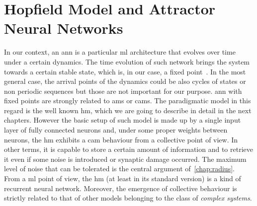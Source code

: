 \documentclass[\rootdir/main.tex]{subfiles}
\begin{document}
\section*{Hopfield Model and Attractor Neural Networks}
In our context, an \acrlong{ann} is a particular \acrlong{ml} architecture that evolves over time under a certain dynamics. The time evolution of such network brings the system towards a certain stable state, which is, in our case, a fixed point~\cite{amit_1989}. In the most general case, the arrival points of the dynamics could be also cycles of states or non periodic sequences but those are not important for our purpose. 
\acrlong{ann} with fixed points are strongly related to \glspl{am} or \glspl{cam}.
The paradigmatic model in this regard is the well known \acrlong{hm}, which we are going to describe in detail in the next chapters. However the basic setup of such model is made up by a single input layer of fully connected neurons and, under some proper weights between neurons, the \acrlong{hm} exhibits a \acrlong{cam} behaviour from a collective point of view. In other terms, it is capable to store a certain amount of information and to retrieve it even if some noise is introduced or synaptic damage occurred. The maximum level of noise that can be tolerated is the central argument of~\cref{chap:radius}.\\
From a \acrlong{ml} point of view, the \acrlong{hm} (at least in its standard version) is a kind of recurrent neural network. Moreover, the emergence of collective behaviour is strictly related to that of other models belonging to the class of \emph{complex systems}.
\end{document}
